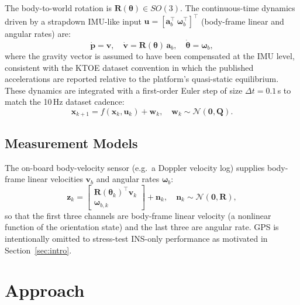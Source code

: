 \documentclass[conference]{IEEEtran}
\begin{document}
The body-to-world rotation is $\mathbf{R}(\boldsymbol{\theta}) \in SO(3)$. The continuous-time dynamics driven by a strapdown IMU-like input $\mathbf{u} = [\mathbf{a}_b^\top\ \boldsymbol{\omega}_b^\top]^\top$ (body-frame linear and angular rates) are:
\begin{equation}
  \dot{\mathbf{p}} = \mathbf{v}, \quad
  \dot{\mathbf{v}} = \mathbf{R}(\boldsymbol{\theta})\,\mathbf{a}_b, \quad
  \dot{\boldsymbol{\theta}} = \boldsymbol{\omega}_b,
  \label{eq:dynamics}
\end{equation}
where the gravity vector is assumed to have been compensated at the IMU level, consistent with the KTOE dataset convention in which the published accelerations are reported relative to the platform's quasi-static equilibrium. These dynamics are integrated with a first-order Euler step of size $\Delta t = 0.1$\,s to match the 10\,Hz dataset cadence:
\begin{equation}
  \mathbf{x}_{k+1} = f(\mathbf{x}_k,\mathbf{u}_k) + \mathbf{w}_k, \quad
  \mathbf{w}_k \sim \mathcal{N}(\mathbf{0}, \mathbf{Q}).
  \label{eq:process}
\end{equation}

\subsection{Measurement Models}

The on-board body-velocity sensor (e.g.\ a Doppler velocity log) supplies body-frame linear velocities $\mathbf{v}_b$ and angular rates $\boldsymbol{\omega}_b$:
\begin{equation}
  \mathbf{z}_k = \begin{bmatrix} \mathbf{R}(\boldsymbol{\theta}_k)^\top \mathbf{v}_k \\ \boldsymbol{\omega}_{b,k} \end{bmatrix} + \mathbf{n}_k,
  \quad \mathbf{n}_k \sim \mathcal{N}(\mathbf{0}, \mathbf{R}),
  \label{eq:meas}
\end{equation}
so that the first three channels are body-frame linear velocity (a nonlinear function of the orientation state) and the last three are angular rate. GPS is intentionally omitted to stress-test INS-only performance as motivated in Section~\ref{sec:intro}.


\section{Approach}
\label{sec:approach}
\end{document}
